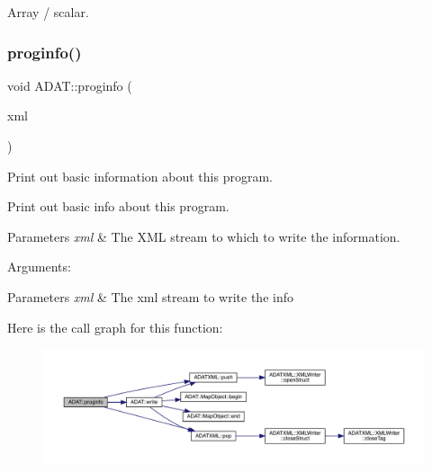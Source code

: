 Array / scalar. 

\mbox{\label{namespaceADAT_a93a8baf56c435bc0fe7bd252601f28f6}} 
\subsubsection{\texorpdfstring{proginfo()}{proginfo()}}
{\footnotesize\ttfamily void A\+D\+A\+T\+::proginfo (\begin{DoxyParamCaption}\item[{\mbox{\hyperlink{classADATXML_1_1XMLWriter}{X\+M\+L\+Writer}} \&}]{xml }\end{DoxyParamCaption})}



Print out basic information about this program. 

Print out basic info about this program.


\begin{DoxyParams}{Parameters}
{\em xml} & The X\+ML stream to which to write the information.\\
\hline
\end{DoxyParams}
Arguments\+:


\begin{DoxyParams}{Parameters}
{\em xml} & The xml stream to write the info \\
\hline
\end{DoxyParams}
Here is the call graph for this function\+:\nopagebreak
\begin{figure}[H]
\begin{center}
\leavevmode
\includegraphics[width=350pt]{d5/d0d/namespaceADAT_a93a8baf56c435bc0fe7bd252601f28f6_cgraph}
\end{center}
\end{figure}
\mbox{\label{namespaceADAT_ab1cb4aab951dd138f8f0a73f5c3ead6d}} 
